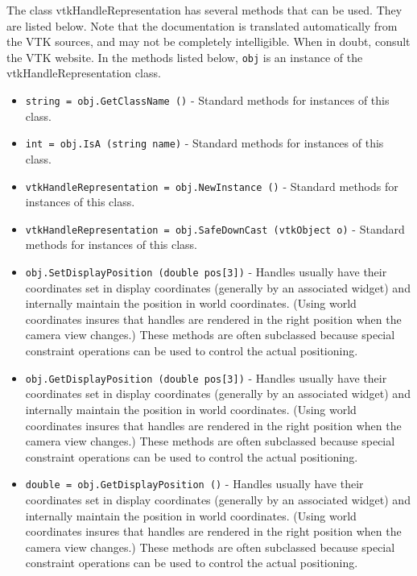 The class vtkHandleRepresentation has several methods that can be used.
  They are listed below.
Note that the documentation is translated automatically from the VTK sources,
and may not be completely intelligible.  When in doubt, consult the VTK website.
In the methods listed below, \verb|obj| is an instance of the vtkHandleRepresentation class.
\begin{itemize}
\item  \verb|string = obj.GetClassName ()| -  Standard methods for instances of this class.

\item  \verb|int = obj.IsA (string name)| -  Standard methods for instances of this class.

\item  \verb|vtkHandleRepresentation = obj.NewInstance ()| -  Standard methods for instances of this class.

\item  \verb|vtkHandleRepresentation = obj.SafeDownCast (vtkObject o)| -  Standard methods for instances of this class.

\item  \verb|obj.SetDisplayPosition (double pos[3])| -  Handles usually have their coordinates set in display coordinates
 (generally by an associated widget) and internally maintain the position
 in world coordinates. (Using world coordinates insures that handles are
 rendered in the right position when the camera view changes.) These
 methods are often subclassed because special constraint operations can
 be used to control the actual positioning.

\item  \verb|obj.GetDisplayPosition (double pos[3])| -  Handles usually have their coordinates set in display coordinates
 (generally by an associated widget) and internally maintain the position
 in world coordinates. (Using world coordinates insures that handles are
 rendered in the right position when the camera view changes.) These
 methods are often subclassed because special constraint operations can
 be used to control the actual positioning.

\item  \verb|double = obj.GetDisplayPosition ()| -  Handles usually have their coordinates set in display coordinates
 (generally by an associated widget) and internally maintain the position
 in world coordinates. (Using world coordinates insures that handles are
 rendered in the right position when the camera view changes.) These
 methods are often subclassed because special constraint operations can
 be used to control the actual positioning.


\end{itemize}
